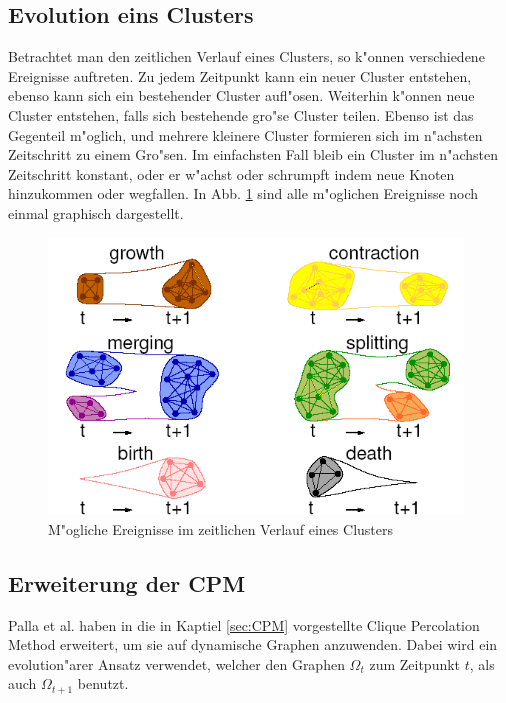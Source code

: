 \documentclass[journal]{vgtc}
\begin{document}
  \subsection{Evolution eins Clusters}
    \label{sec:evolution}
    Betrachtet man den zeitlichen Verlauf eines Clusters, so k"onnen verschiedene Ereignisse auftreten. Zu jedem Zeitpunkt kann ein neuer Cluster
    entstehen, ebenso kann sich ein bestehender Cluster aufl"osen. Weiterhin k"onnen neue Cluster entstehen, falls sich bestehende gro"se Cluster
    teilen. Ebenso ist das Gegenteil m"oglich, und mehrere kleinere Cluster formieren sich im n"achsten Zeitschritt zu einem Gro"sen.
    Im einfachsten Fall bleib ein Cluster im n"achsten Zeitschritt konstant, oder er w"achst oder schrumpft indem neue Knoten hinzukommen oder wegfallen.
    In Abb. \ref{fig:evolution} sind alle m"oglichen Ereignisse noch einmal graphisch dargestellt.
    \begin{figure}[t]
      \centering
      \includegraphics[width=11cm]{images/evolution_alone}
      \caption{M"ogliche Ereignisse im zeitlichen Verlauf eines Clusters \cite{CPM_time}}
      \label{fig:evolution}
    \end{figure}
  \subsection{Erweiterung der CPM}
    \label{sec:CPM_time}
    Palla et al. haben in \cite{CPM_time} die in Kaptiel \ref{sec:CPM} vorgestellte Clique Percolation Method erweitert, um sie auf dynamische
    Graphen anzuwenden. Dabei wird ein evolution"arer Ansatz verwendet, welcher den Graphen $\Omega_{t}$ zum Zeitpunkt $t$, als auch $\Omega_{t+1}$
    benutzt.
    
\end{document}
